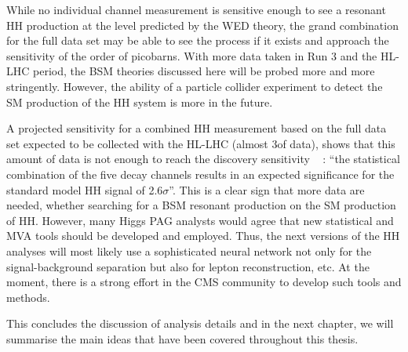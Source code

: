\begin{small}
While no individual channel measurement is sensitive enough to see a resonant HH production at the level predicted by the WED theory, the grand combination for the full data set may be able to see the process if it exists and approach the sensitivity of the order of picobarns. With more data taken in Run 3 and the HL-LHC period, the BSM theories discussed here will be probed more and more stringently. However, the ability of a particle collider experiment to detect the SM production of the HH system is more in the future.

A projected sensitivity for a combined HH measurement based on the full data set expected to be collected with the HL-LHC (almost 3\abinv of data), shows that this amount of data is not enough to reach the discovery sensitivity ~\cite{CMS-PAS-FTR-18-019} : ``the statistical combination of the five decay channels results in an expected significance for the standard model HH signal of 2.6$\sigma$''. This is a clear sign that more data are needed, whether searching for a BSM resonant production on the SM production of HH. However, many Higgs PAG analysts would agree that new statistical and MVA tools should be developed and employed. Thus, the next versions of the HH analyses will most likely use a sophisticated neural network not only for the signal-background separation but also for lepton reconstruction, etc. At the moment, there is a strong effort in the CMS community to develop such tools and methods. 

This concludes the discussion of analysis details and in the next chapter, we will summarise the main ideas that have been covered throughout this thesis. 

\end{small}



